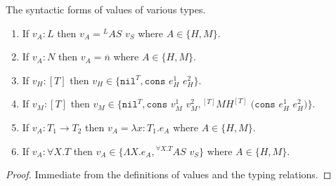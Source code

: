\begin{lemma}
\label{cf}
The syntactic forms of values of various types.
\begin{enumerate}
\item If $v_{A}:L$ then $v_{A}={^{L}A}S$ $v_{S}$ where $A\in\lbrace H,M\rbrace$.
\item If $v_{A}:N$ then $v_{A}=\overline{n}$ where $A\in\lbrace H,M\rbrace$.
\item If $v_{H}:[T]$ then $v_{H}\in\lbrace\mathtt{nil}^{T},\mathtt{cons}$ $e_{H}^{1}$ $e_{H}^{2}\rbrace$.
\item If $v_{M}:[T]$ then $v_{M}\in\lbrace\mathtt{nil}^{T},\mathtt{cons}$ $v_{M}^{1}$ $v_{M}^{2},{^{[T]}M}H^{[T]}$ $(\mathtt{cons}$ $e_{H}^{1}$ $e_{H}^{2})\rbrace$.
\item If $v_{A}:T_{1}\rightarrow T_{2}$ then $v_{A}=\lambda x:T_{1}.e_{A}$ where $A\in\lbrace H,M\rbrace$.
\item If $v_{A}:\forall X.T$ then $v_{A}\in\lbrace\Lambda X.e_{A},{^{\forall X.T}A}S$ $v_{S}\rbrace$ where $A\in\lbrace H,M\rbrace$.
\end{enumerate}
\begin{proof}
Immediate from the definitions of values and the typing relations.
\end{proof}
\end{lemma}